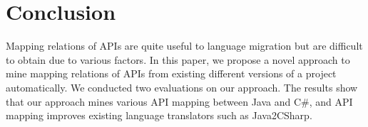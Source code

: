 \section{Conclusion}
\label{sec:conclusion} 

Mapping relations of APIs are quite useful to
language migration but are difficult to obtain due to various
factors. In this paper, we propose a novel approach to mine mapping
relations of APIs from existing different versions of a project
automatically. We conducted two evaluations on our approach. The
results show that our approach mines various API mapping between
Java and C\#, and API mapping improves existing language translators
such as Java2CSharp.
